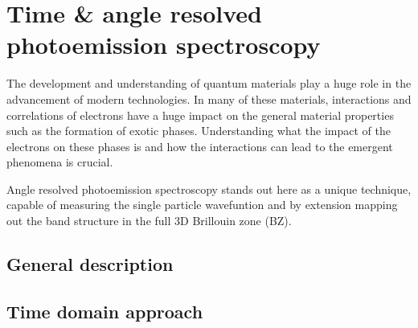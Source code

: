 \chapter{Time \& angle resolved photoemission spectroscopy}

The development and understanding of quantum materials play a huge role in the advancement of modern technologies.
In many of these materials, interactions and correlations of electrons have a huge impact on the general material properties such as the formation of exotic phases.
Understanding what the impact of the electrons on these phases is and how the interactions can lead to the emergent phenomena is crucial.

Angle resolved photoemission spectroscopy stands out here as a unique technique, capable of measuring the single particle wavefuntion and by extension mapping out the band structure in the full 3D Brillouin zone (BZ).



\section{General description}



\section{Time domain approach}

